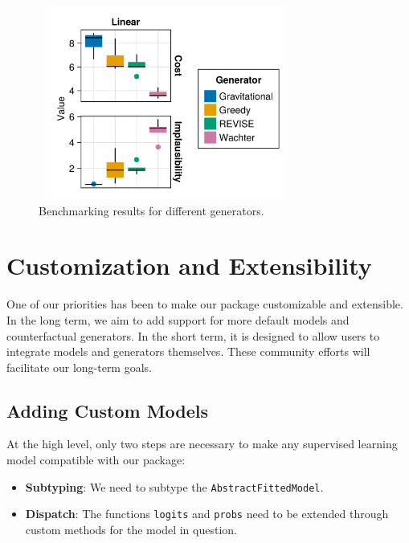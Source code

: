 \documentclass{juliacon}
\providecommand{\tightlist}{%
  \setlength{\itemsep}{0pt}\setlength{\parskip}{0pt}}\usepackage{longtable,booktabs,array}
\begin{document}
\begin{figure}

{\centering \includegraphics[width=3.33333in,height=2.5in]{www/bmk.png}

}

\caption{\label{fig-bmk}Benchmarking results for different generators.}

\end{figure}

\hypertarget{sec-custom}{%
\section{Customization and Extensibility}\label{sec-custom}}

One of our priorities has been to make our package customizable and
extensible. In the long term, we aim to add support for more default
models and counterfactual generators. In the short term, it is designed
to allow users to integrate models and generators themselves. These
community efforts will facilitate our long-term goals.

\hypertarget{sec-custom-mod}{%
\subsection{Adding Custom Models}\label{sec-custom-mod}}

At the high level, only two steps are necessary to make any supervised
learning model compatible with our package:

\begin{itemize}
\tightlist
\item
  \textbf{Subtyping}: We need to subtype the
  \texttt{AbstractFittedModel}.
\item
  \textbf{Dispatch}: The functions \texttt{logits} and \texttt{probs}
  need to be extended through custom methods for the model in question.
\end{itemize}
\end{document}

